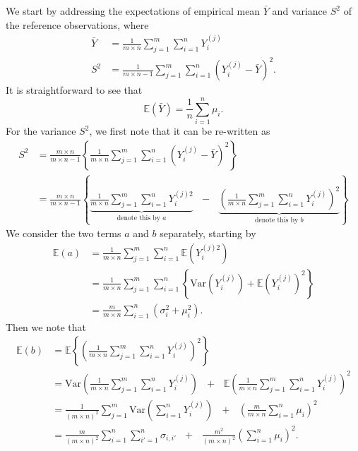 \documentclass[12pt]{article}
\newcommand{\sd}{s}
\begin{document}
We start by addressing the expectations of empirical mean $\bar{Y}$ and variance $S^2$ of the reference observations, where
\begin{align*}
\bar{Y} & = \frac{1}{m \times n} \sum_{j = 1}^m \sum_{i = 1}^n Y_i^{(j)}\\
S^2 & = \frac{1}{m\times n - 1} \sum_{j = 1}^m \sum_{i = 1}^n \left(Y_i^{(j)} - \bar{Y}\right)^2.
\end{align*}
It is straightforward to see that 
\begin{equation}
\mathbb{E}(\bar{Y}) = \frac{1}{n} \sum_{i = 1}^n \mu_i.
\end{equation}
For the variance $S^2$, we first note that it can be re-written as
\begin{align}
S^2 & = \frac{m\times n}{m\times n - 1} \left\{\frac{1}{m\times n} \sum_{j = 1}^m \sum_{i = 1}^n \left(Y_i^{(j)} - \bar{Y}\right)^2 \right\}\\
& = \frac{m\times n}{m\times n - 1} \left\{ \underbrace{\frac{1}{m\times n} \sum_{j = 1}^m \sum_{i = 1}^n Y_i^{(j)2}}_{\text{denote this by } a} \ \ \ - \ \ \ \underbrace{\left(\frac{1}{m\times n} \sum_{j = 1}^m \sum_{i = 1}^n Y_i^{(j)} \right)^2}_{\text{denote this by } b} \right\} \label{eq:sigma2hat}
\end{align}
We consider the two terms $a$ and $b$ separately, starting by
\begin{align*}
\mathbb{E}(a) & = \frac{1}{m\times n} \sum_{j = 1}^m \sum_{i = 1}^n \mathbb{E}\left(Y_i^{(j)2}\right)\\
& = \frac{1}{m\times n} \sum_{j = 1}^m \sum_{i = 1}^n \left\{ \text{Var}\left(Y_i^{(j)}\right) + \mathbb{E}\left(Y_i^{(j)}\right)^2 \right\}\\
& = \frac{m}{m\times n} \sum_{i = 1}^n (\sigma_{i}^2 + \mu_i^2).
\end{align*}
Then we note that
\begin{align*}
\mathbb{E}(b) & = \mathbb{E}\left\{\left(\frac{1}{m\times n} \sum_{j = 1}^m \sum_{i = 1}^n Y_i^{(j)} \right)^2\right\}\\
& = \text{Var}\left( \frac{1}{m \times n} \sum_{j = 1}^m \sum_{i = 1}^n Y_i^{(j)} \right) \ \ \ + \ \ \ \mathbb{E}\left(\frac{1}{m \times n}  \sum_{j = 1}^m \sum_{i = 1}^n Y_i^{(j)} \right)^2\\
& = \frac{1}{(m \times n)^2}\sum_{j = 1}^m \text{Var}\left(\sum_{i = 1}^n Y_i^{(j)} \right) \ \ \ + \ \ \ \left(\frac{m}{m \times n} \sum_{i = 1}^n \mu_i\right)^2\\
& = \frac{m}{(m \times n)^2} \sum_{i = 1}^n \sum_{i' = 1}^n \sigma_{i,i'} \ \ \ + \ \ \ \frac{m^2}{(m \times n)^2}\left(\sum_{i = 1}^n \mu_i\right)^2.
\end{align*}
\end{document}
